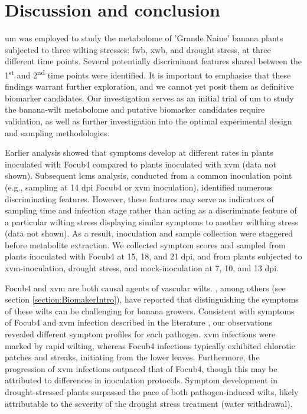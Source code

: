 \newpage
\section{Discussion and conclusion}

\Acf{um} was employed to study the metabolome of 'Grande Naine' banana plants subjected to three wilting stresses: \acf{fwb}, \acf{xwb}, and drought stress, at three different time points. Several potentially discriminant features shared between the 1\textsuperscript{st} and 2\textsuperscript{nd} time points were identified. It is important to emphasise that these findings warrant further exploration, and we cannot yet posit them as definitive biomarker candidates. Our investigation serves as an initial trial of \ac{um} to study the banana-wilt metabolome and putative biomarker candidates require validation, as well as further investigation into the optimal experimental design and sampling methodologies.

Earlier analysis showed that symptoms develop at different rates in plants inoculated with \ac{Focub4} compared to plants inoculated with \ac{xvm} (data not shown). Subsequent \ac{lcms} analysis, conducted from a common inoculation point (e.g., sampling at 14 \ac{dpi} \ac{Focub4} or \ac{xvm} inoculation), identified numerous discriminating features. However, these features may serve as indicators of sampling time and infection stage rather than acting as a discriminate feature of a particular wilting stress displaying similar symptoms to another wilthing stress (data not shown). As a result, inoculation and sample collection were staggered before metabolite extraction. We collected symptom scores and sampled from plants inoculated with \ac{Focub4} at 15, 18, and 21 \ac{dpi}, and from plants subjected to \ac{xvm}-inoculation, drought stress, and mock-inoculation at 7, 10, and 13 \ac{dpi}.

\ac{Focub4} and \ac{xvm} are both causal agents of vascular wilts. \textcite{Biruma2007}, among others (see section \ref{section:BiomakerIntro}), have reported that distinguishing the symptoms of these wilts can be challenging for banana growers. Consistent with symptoms of \ac{Focub4} and \ac{xvm} infection described in the literature \parencite{Ploetz2015a, Garcia-Bastidas2019, Ordonez2015a, Ocimati2022, Tripathi2021}, our observations revealed different symptom profiles for each pathogen. \ac{xvm} infections were marked by rapid wilting, whereas \ac{Focub4} infections typically exhibited chlorotic patches and streaks, initiating from the lower leaves. Furthermore, the progression of \ac{xvm} infections outpaced that of \ac{Focub4}, though this may be attributed to differences in inoculation protocols. Symptom development in drought-stressed plants surpassed the pace of both pathogen-induced wilts, likely attributable to the severity of the drought stress treatment (water withdrawal). 

